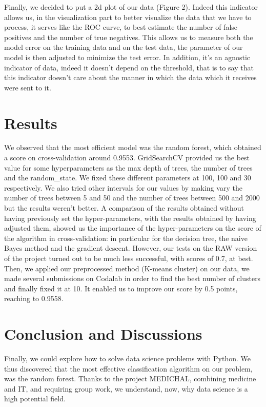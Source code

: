 \documentclass[10pt]{report}
\begin{document}
Finally, we decided to put a 2d plot of our data (Figure 2). Indeed this indicator allows us, in the visualization part to better visualize the data that we have to process, it serves like the ROC curve, to best estimate the number of false positives and the number of true negatives.
This allows us to measure both the model error on the training data and on the test data, the parameter of our model is then adjusted to minimize the test error.
In addition, it's an agnostic indicator of data, indeed it doesn't depend on the threshold, that is to say that this indicator doesn't care about the manner in which the data which it receives were sent to it.

\bigbreak

\section*{Results}

\bigbreak

We observed that the most efficient model was the random forest, which obtained a score on cross-validation around 0.9553. GridSearchCV provided us the best value for some hyperparameters as the max depth of trees, the number of trees and the random\_state. We fixed these different parameters at 100, 100 and 30 respectively. We also tried other intervals for our values by making vary the number of trees between 5 and 50 and the number of trees between 500 and 2000 but the results weren't better. \medbreak 
A comparison of the results obtained without having previously set the hyper-parameters, with the results obtained by having adjusted them, showed us the importance of the hyper-parameters on the score of the algorithm in cross-validation: in particular for the decision tree, the naive Bayes method and the gradient descent. However, our tests on the RAW version of the project turned out to be much less successful, with scores of 0.7, at best. \medbreak
Then, we applied our preprocessed method (K-means cluster) on our data, we made several submissions on Codalab in order to find the best number of clusters and finally fixed it at 10. It enabled us to improve our score by 0.5 points, reaching to 0.9558. \medbreak

\section*{Conclusion and Discussions}

Finally, we could explore how to solve data science problems with Python. We thus discovered that the most effective classification algorithm on our problem, was the random forest. Thanks to the project MEDICHAL, combining medicine and IT, and requiring group work, we understand, now, why data science is a high potential field.
\end{document}
